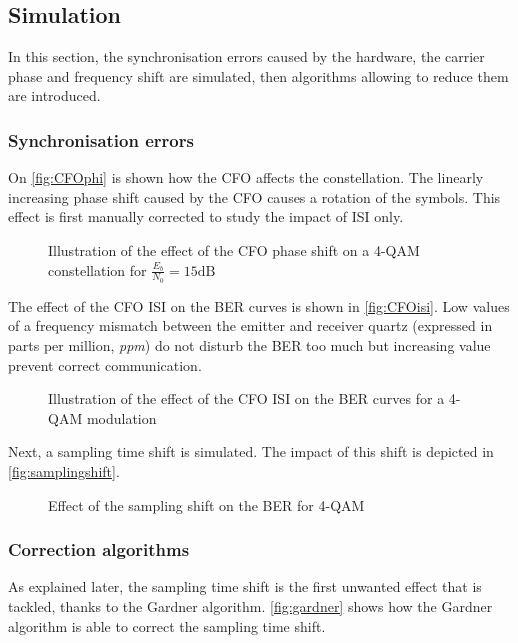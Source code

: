 \subsection{Simulation}
In this section, the synchronisation errors caused by the hardware, the carrier phase and frequency shift are simulated, then algorithms allowing to reduce them are introduced.

\subsubsection{Synchronisation errors}

On \autoref{fig:CFOphi} is shown how the CFO affects the constellation. The linearly increasing phase shift caused by the CFO causes a rotation of the symbols. This effect is first manually corrected to study the impact of ISI only.

\begin{figure}[H]
    \centering
    
    \caption{Illustration of the effect of the CFO phase shift on a 4-QAM constellation for $\frac{E_b}{N_0} = 15 \si{\deci\bel}$}
    \label{fig:CFOphi}
\end{figure}

The effect of the CFO ISI on the BER curves is shown in \autoref{fig:CFOisi}. Low values of a frequency mismatch between the emitter and receiver quartz (expressed in parts per million, \textit{ppm}) do not disturb the BER too much but increasing value prevent correct communication. 

\begin{figure}[H]
    \centering
    
    \caption{Illustration of the effect of the CFO ISI on the BER curves for a 4-QAM modulation}
    \label{fig:CFOisi}
\end{figure}

Next, a sampling time shift is simulated. The impact of this shift is depicted in \autoref{fig:samplingshift}.

\begin{figure}[H]
    \centering
    
    \caption{Effect of the sampling shift on the BER for 4-QAM}
    \label{fig:samplingshift}
\end{figure}


\subsubsection{Correction algorithms}

As explained later, the sampling time shift is the first unwanted effect that is tackled, thanks to the Gardner algorithm. \autoref{fig:gardner} shows how the Gardner algorithm is able to correct the sampling time shift.

